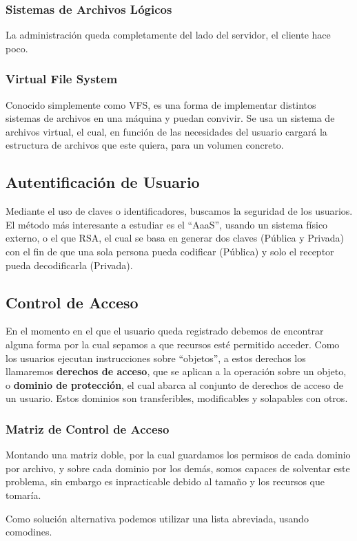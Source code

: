 \subsubsection{Sistemas de Archivos Lógicos}
La administración queda completamente del lado del servidor, el cliente hace poco.
\subsubsection{Virtual File System}
Conocido simplemente como VFS, es una forma de implementar distintos sistemas de archivos en una máquina y puedan convivir. Se usa un sistema de archivos virtual, el cual, en función de las necesidades del usuario cargará la estructura de archivos que este quiera, para un volumen concreto.
\subsection{Autentificación de Usuario}
Mediante el uso de claves o identificadores, buscamos la seguridad de los usuarios. El método más interesante a estudiar es el ``AaaS'', usando un sistema físico externo, o el que RSA, el cual se basa en generar dos claves (Pública y Privada) con el fin de que una sola persona pueda codificar (Pública) y solo el receptor pueda decodificarla (Privada).
\subsection{Control de Acceso}
En el momento en el que el usuario queda registrado debemos de encontrar alguna forma por la cual sepamos a que recursos esté permitido acceder. Como los usuarios ejecutan instrucciones sobre ``objetos'', a estos derechos los llamaremos \textbf{derechos de acceso}, que se aplican a la operación sobre un objeto, o \textbf{dominio de protección}, el cual abarca al conjunto de derechos de acceso de un usuario. Estos dominios son transferibles, modificables y solapables con otros.
\subsubsection{Matriz de Control de Acceso}
Montando una matriz doble, por la cual guardamos los permisos de cada dominio por archivo, y sobre cada dominio por los demás, somos capaces de solventar este problema, sin embargo es inpracticable debido al tamaño y los recursos que tomaría.
\par  Como solución alternativa podemos utilizar una lista abreviada, usando comodines.